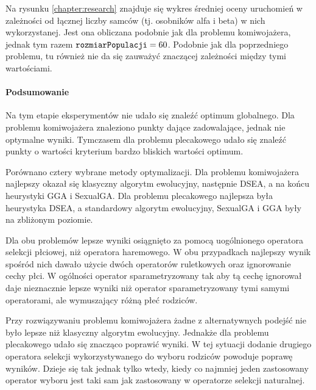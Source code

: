 \documentclass[./FM_mgr.tex]{subfiles}
\begin{document}
Na rysunku \ref{chapter:research} znajduje się wykres średniej oceny uruchomień w zależności od łącznej liczby samców (tj. osobników alfa i beta) w nich wykorzystanej.
Jest ona obliczana podobnie jak dla problemu komiwojażera, jednak tym razem $\mathtt{rozmiarPopulacji}=60$.
Podobnie jak dla poprzedniego problemu, tu również nie da się zauważyć znaczącej zależności między tymi wartościami.

\paragraph{Podsumowanie}

Na tym etapie eksperymentów nie udało się znaleźć optimum globalnego.
Dla problemu komiwojażera znaleziono punkty dające zadowalające, jednak nie optymalne wyniki.
Tymczasem dla problemu plecakowego udało się znaleźć punkty o wartości kryterium bardzo bliskich wartości optimum.

Porównano cztery wybrane metody optymalizacji.
Dla problemu komiwojażera najlepszy okazał się klasyczny algorytm ewolucyjny, następnie DSEA, a na końcu heurystyki GGA i SexualGA.
Dla problemu plecakowego najlepsza była heurystyka DSEA, a standardowy algorytm ewolucyjny, SexualGA i GGA były na zbliżonym poziomie.

Dla obu problemów lepsze wyniki osiągnięto za pomocą uogólnionego operatora selekcji płciowej, niż operatora haremowego.
W obu przypadkach najlepszy wynik spośród nich dawało użycie dwóch operatorów ruletkowych oraz ignorowanie cechy płci.
W ogólności operator sparametryzowany tak aby tą cechę ignorował daje nieznacznie lepsze wyniki niż operator sparametryzowany tymi samymi operatorami, ale wymuszający różną płeć rodziców.

Przy rozwiązywaniu problemu komiwojażera żadne z alternatywnych podejść nie było lepsze niż klasyczny algorytm ewolucyjny.
Jednakże dla problemu plecakowego udało się znacząco poprawić wyniki.
W tej sytuacji dodanie drugiego operatora selekcji wykorzystywanego do wyboru rodziców powoduje poprawę wyników.
Dzieje się tak jednak tylko wtedy, kiedy co najmniej jeden zastosowany operator wyboru jest taki sam jak zastosowany w operatorze selekcji naturalnej.
\end{document}
